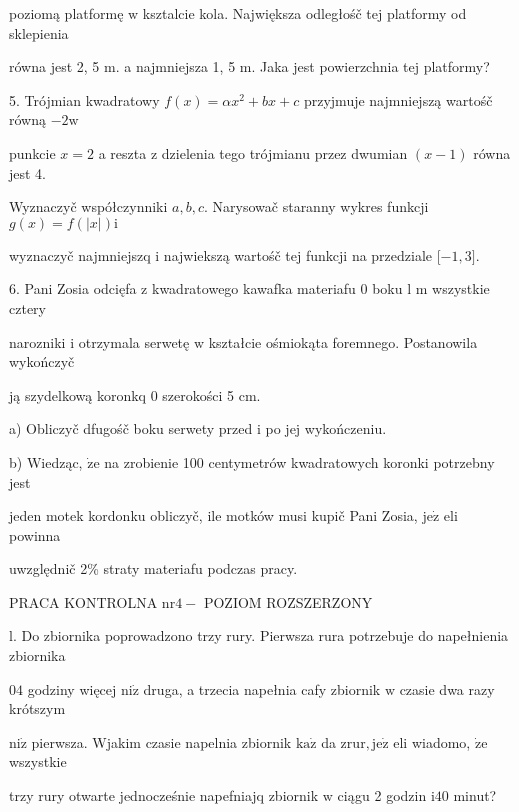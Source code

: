 \documentclass[a4paper,12pt]{article}
\begin{document}
poziomą platformę $\mathrm{w}$ ksztalcie kola. Największa odległośč tej platformy od sklepienia

równa jest 2, 5 $\mathrm{m}$. a najmniejsza 1, 5 $\mathrm{m}$. Jaka jest powierzchnia tej platformy?

5. Trójmian kwadratowy $f(x)=\alpha x^{2}+bx+c$ przyjmuje najmniejszą wartośč równą $-2\mathrm{w}$

punkcie $x=2$ a reszta $\mathrm{z}$ dzielenia tego trójmianu przez dwumian $(x-1)$ równa jest 4.

Wyznaczyč współczynniki $a, b, c$. Narysowač staranny wykres funkcji $g(x) = f(|x|) \mathrm{i}$

wyznaczyč najmniejszq $\mathrm{i}$ najwiekszą wartośč tej funkcji na przedziale [$-1,3].$

6. Pani Zosia odcięfa $\mathrm{z}$ kwadratowego kawafka materiafu $0$ boku l $\mathrm{m}$ wszystkie cztery

narozniki $\mathrm{i}$ otrzymala serwetę $\mathrm{w}$ kształcie ośmiokąta foremnego. Postanowila wykończyč

ją szydelkową koronkq $0$ szerokości 5 cm.

a) Obliczyč dfugośč boku serwety przed $\mathrm{i}$ po jej wykończeniu.

b) Wiedząc, $\dot{\mathrm{z}}\mathrm{e}$ na zrobienie 100 centymetrów kwadratowych koronki potrzebny jest

jeden motek kordonku obliczyč, ile motków musi kupič Pani Zosia, $\mathrm{j}\mathrm{e}\dot{\mathrm{z}}$ eli powinna

uwzględnič 2\% straty materiafu podczas pracy.





PRACA KONTROLNA $\mathrm{n}\mathrm{r}4-$ POZIOM ROZSZERZONY

l. Do zbiornika poprowadzono trzy rury. Pierwsza rura potrzebuje do napełnienia zbiornika

$04$ godziny więcej $\mathrm{n}\mathrm{i}\dot{\mathrm{z}}$ druga, a trzecia napełnia cafy zbiornik $\mathrm{w}$ czasie dwa razy krótszym

$\mathrm{n}\mathrm{i}\dot{\mathrm{z}}$ pierwsza. Wjakim czasie napelnia zbiornik $\mathrm{k}\mathrm{a}\dot{\mathrm{z}}$ da $\mathrm{z}\mathrm{r}\mathrm{u}\mathrm{r}, \mathrm{j}\mathrm{e}\dot{\mathrm{z}}$ eli wiadomo, $\dot{\mathrm{z}}\mathrm{e}$ wszystkie

trzy rury otwarte jednocześnie napefniajq zbiornik $\mathrm{w}$ ciągu 2 godzin $\mathrm{i}40$ minut?
\end{document}
